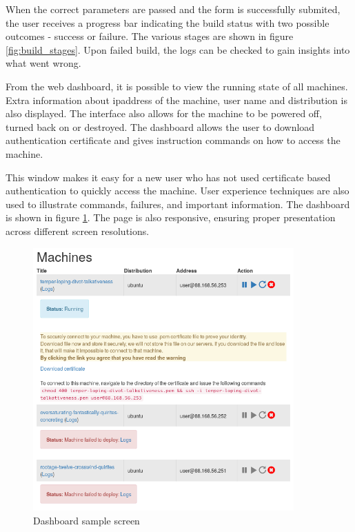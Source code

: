 \documentclass{article}
\begin{document}
When the correct parameters are passed and the form is successfully submited, the user receives a progress bar indicating the build status with two possible outcomes - success or failure. The various stages are shown in figure \ref{fig:build_stages}.
Upon failed build, the logs can be checked to gain insights into what went wrong.

From the web dashboard, it is possible to view the running state of all machines. Extra information about \gls{ipaddress} of the machine, user name and distribution is also displayed. The interface also allows for the machine to be powered off, turned back on or destroyed. The dashboard allows the user to download authentication certificate and gives instruction commands on how to access the machine.

This window makes it easy for a new user who has not used certificate based authentication to quickly access the machine. User experience techniques are also used to illustrate commands, failures, and important information. The dashboard is shown in figure \ref{fig:web-interface-dashboard}. The page is also responsive, ensuring proper presentation across different screen resolutions.

\begin{figure}[H]
	\vspace{0.5cm}
	\includegraphics[width=10cm]{dashboard}
	\vspace{0.5cm}
	\caption{Dashboard sample screen}
	\label{fig:web-interface-dashboard}
\end{figure}
\end{document}
